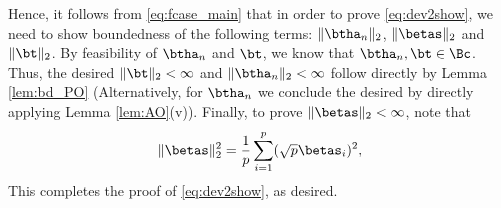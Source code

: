 Hence, it follows from \eqref{eq:fcase_main} that in order to prove \eqref{eq:dev2show}, we need to show boundedness of the following terms: $\|\btha_n\|_2$, $\|\betas\|_2$ and $\|\bt\|_2$. {By feasibility of $\btha_n$ and $\bt$, we know that $\btha_n,\bt\in\Bc$. Thus, the desired $\|\bt\|_2<\infty$ and $\|\btha_n\|_2<\infty$ follow directly by Lemma \ref{lem:bd_PO} (Alternatively, for $\btha_n$ we conclude the desired by directly applying Lemma \ref{lem:AO}(v)).} Finally, to prove $\|\betas\|_2<\infty$, note that
$$
\|\betas\|_2^2 =\frac{1}{p}\sum_{i=1}^p(\sqrt{p}\betas_i)^2,
$$
 This completes the proof of \eqref{eq:dev2show}, as desired.


